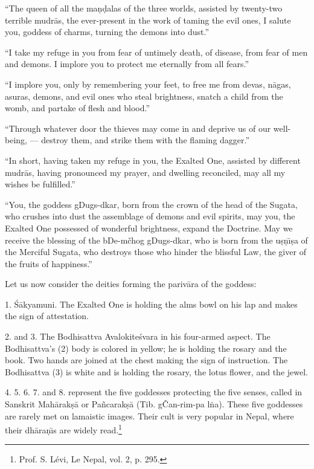 \documentclass[a4paper, 12pt, oneside]{article}
\begin{document}
``The queen of all the ma\d{n}\d{d}alas of the three worlds, assisted by twenty-two terrible mudr\={a}s, the ever-present in the work of taming the evil ones, I salute you, goddess of charms, turning the demons into dust.''

``I take my refuge in you from fear of untimely death, of disease, from fear of men and demons. I implore you to protect me eternally from all fears.''

``I implore you, only by remembering your feet, to free me from devas, n\={a}gas, asuras, demons, and evil ones who steal brightness, snatch a child from the womb, and partake of flesh and blood.''

``Through whatever door the thieves may come in and deprive us of our well-being, --- destroy them, and strike them with the flaming dagger.''

``In short, having taken my refuge in you, the Exalted One, assisted by different mudr\={a}s, having pronounced my prayer, and dwelling reconciled, may all my wishes be fulfilled.''

``You, the goddess gDugs-dkar, born from the crown of the head of the Sugata, who crushes into dust the assemblage of demons and evil spirits, may you, the Exalted One possessed of wonderful brightness, expand the Doctrine. May we receive the blessing of the bDe-mčhog gDugs-dkar, who is born from the u\d{s}\d{n}\={\i}\d{s}a of the Merciful Sugata, who destroys those who hinder the blissful Law, the giver of the fruits of happiness.''

Let us now consider the deities forming the pariv\={a}ra of the goddess:

1. \'{S}\={a}kyamuni. The Exalted One is holding the alms bowl on his lap and makes the sign of attestation.

2. and 3. The Bodhisattva Avalokite\'{s}vara in his four-armed aspect. The Bodhisattva's (2) body is colored in yellow; he is holding the rosary and the book. Two hands are joined at the chest making the sign of instruction. The Bodhisattva (3) is white and is holding the rosary, the lotus flower, and the jewel.

4. 5. 6. 7. and 8. represent the five goddesses protecting the five senses, called in Sanskrit Mah\={a}rak\d{s}\={a} or Pa\~{n}carak\d{s}\={a} (Tib. gČan-rim-pa l\.{n}a). These five goddesses are rarely met on lamaistic images. Their cult is very popular in Nepal, where their dh\={a}ra\d{n}\={\i}s are widely read.\footnote{Prof. S. Lévi, Le Nepal, vol. 2, p. 295.}
\end{document}
